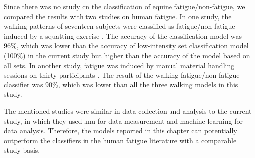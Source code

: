 Since there was no study on the classification of equine fatigue/non-fatigue, we compared the results with two studies on human fatigue. In one study, the walking patterns of seventeen subjects were classified as fatigue/non-fatigue induced by a squatting exercise \cite{Zhang2014}. The accuracy of the classification model was 96\%, which was lower than the accuracy of low-intensity \gls{set} classification model (100\%) in the current study but higher than the accuracy of the model based on all \gls{set}s. In another study, fatigue was induced by manual material handling sessions on thirty participants \cite{Baghdadi2018}. The result of the walking fatigue/non-fatigue classifier was 90\%, which was lower than all the three walking models in this study. 

The mentioned studies were similar in data collection and analysis to the current study, in which they used \gls{imu} for data measurement and machine learning for data analysis. Therefore, the models reported in this chapter can potentially outperform the classifiers in the human fatigue literature with a comparable study basis.
